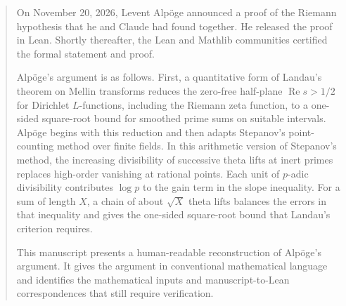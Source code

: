 \begin{abstract}
On November 20, 2026, Levent Alp\"oge announced a proof of the Riemann hypothesis that he and Claude had found together. He released the proof in Lean. Shortly thereafter, the Lean and Mathlib communities certified the formal statement and proof.

Alp\"oge's argument is as follows. First, a quantitative form of Landau's theorem on Mellin transforms reduces the zero-free half-plane $\operatorname{Re}s>1/2$ for Dirichlet $L$-functions, including the Riemann zeta function, to a one-sided square-root bound for smoothed prime sums on suitable intervals. Alp\"oge begins with this reduction and then adapts Stepanov's point-counting method over finite fields. In this arithmetic version of Stepanov's method, the increasing divisibility of successive theta lifts at inert primes replaces high-order vanishing at rational points. Each unit of $p$-adic divisibility contributes $\log p$ to the gain term in the slope inequality. For a sum of length $X$, a chain of about $\sqrt X$ theta lifts balances the errors in that inequality and gives the one-sided square-root bound that Landau's criterion requires.

This manuscript presents a human-readable reconstruction of Alp\"oge's argument. It gives the argument in conventional mathematical language and identifies the mathematical inputs and manuscript-to-Lean correspondences that still require verification.
\end{abstract}
